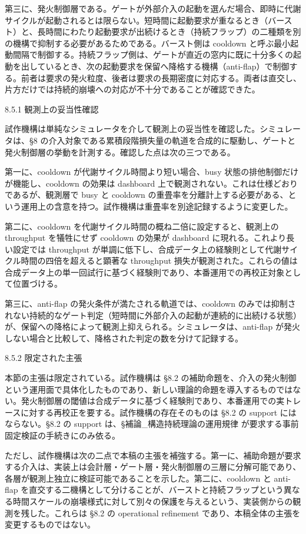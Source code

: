 \documentclass[12pt,a4paper]{article}
\begin{document}
第三に、発火制御層である。ゲートが外部介入の起動を選んだ場合、即時に代謝サイクルが起動されるとは限らない。短時間に起動要求が重なるとき（バースト）と、長時間にわたり起動要求が出続けるとき（持続フラップ）の二種類を別の機構で抑制する必要があるためである。バースト側は cooldown と呼ぶ最小起動間隔で制御する。持続フラップ側は、ゲートが直近の窓内に既に十分多くの起動を出しているとき、次の起動要求を保留へ降格する機構（anti-flap）で制御する。前者は要求の発火粒度、後者は要求の長期密度に対応する。両者は直交し、片方だけでは持続的崩壊への対応が不十分であることが確認できた。

8.5.1 観測上の妥当性確認

試作機構は単純なシミュレータを介して観測上の妥当性を確認した。シミュレータは、§8 の介入対象である累積段階損失量の軌道を合成的に駆動し、ゲートと発火制御層の挙動を計測する。確認した点は次の三つである。

第一に、cooldown が代謝サイクル時間より短い場合、busy 状態の排他制御だけが機能し、cooldown の効果は dashboard 上で観測されない。これは仕様どおりであるが、観測層で busy と cooldown の重畳率を分離計上する必要がある、という運用上の含意を持つ。試作機構は重畳率を別途記録するように変更した。

第二に、cooldown を代謝サイクル時間の概ね二倍に設定すると、観測上の throughput を犠牲にせず cooldown の効果が dashboard に現れる。これより長い設定では throughput が単調に低下し、合成データ上の経験則として代謝サイクル時間の四倍を超えると顕著な throughput 損失が観測された。これらの値は合成データ上の単一回試行に基づく経験則であり、本番運用での再校正対象として位置づける。

第三に、anti-flap の発火条件が満たされる軌道では、cooldown のみでは抑制されない持続的なゲート判定（短時間に外部介入の起動が連続的に出続ける状態）が、保留への降格によって観測上抑えられる。シミュレータは、anti-flap が発火しない場合と比較して、降格された判定の数を分けて記録する。

8.5.2 限定された主張

本節の主張は限定されている。試作機構は §8.2 の補助命題を、介入の発火制御という運用面で具体化したものであり、新しい理論的命題を導入するものではない。発火制御層の閾値は合成データに基づく経験則であり、本番運用での実トレースに対する再校正を要する。試作機構の存在そのものは §8.2 の support にはならない。§8.2 の support は、§補論\_構造持続理論の運用規律 が要求する事前固定検証の手続きにのみ依る。

ただし、試作機構は次の二点で本稿の主張を補強する。第一に、補助命題が要求する介入は、実装上は会計層・ゲート層・発火制御層の三層に分解可能であり、各層が観測上独立に検証可能であることを示した。第二に、cooldown と anti-flap を直交する二機構として分けることが、バーストと持続フラップという異なる時間スケールの崩壊様式に対して別々の保護を与えるという、実装側からの観測を残した。これらは §8.2 の operational refinement であり、本稿全体の主張を変更するものではない。
\end{document}

